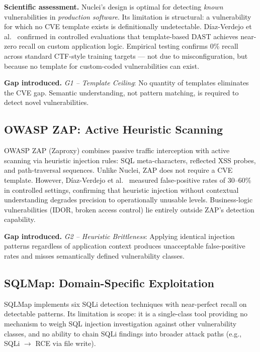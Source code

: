 \documentclass[12pt,a4paper,oneside,openany]{book}
\begin{document}
\textbf{Scientific assessment.} Nuclei's design is optimal for detecting \textit{known} vulnerabilities in \textit{production software}. Its limitation is structural: a vulnerability for which no CVE template exists is definitionally undetectable. D\'iaz-Verdejo et al.\ \cite{diaz2022evaluation} confirmed in controlled evaluations that template-based DAST achieves near-zero recall on custom application logic. Empirical testing confirms 0\% recall across standard CTF-style training targets --- not due to misconfiguration, but because no template for custom-coded vulnerabilities can exist.

\textbf{Gap introduced.} \textit{G1 -- Template Ceiling}: No quantity of templates eliminates the CVE gap. Semantic understanding, not pattern matching, is required to detect novel vulnerabilities.

\subsection{OWASP ZAP: Active Heuristic Scanning}

OWASP ZAP (Zaproxy) combines passive traffic interception with active scanning via heuristic injection rules: SQL meta-characters, reflected XSS probes, and path-traversal sequences. Unlike Nuclei, ZAP does not require a CVE template. However, D\'iaz-Verdejo et al.\ \cite{diaz2022evaluation} measured false-positive rates of 30--60\% in controlled settings, confirming that heuristic injection without contextual understanding degrades precision to operationally unusable levels. Business-logic vulnerabilities (IDOR, broken access control) lie entirely outside ZAP's detection capability.

\textbf{Gap introduced.} \textit{G2 -- Heuristic Brittleness}: Applying identical injection patterns regardless of application context produces unacceptable false-positive rates and misses semantically defined vulnerability classes.

\subsection{SQLMap: Domain-Specific Exploitation}

SQLMap implements six SQLi detection techniques with near-perfect recall on detectable patterns. Its limitation is scope: it is a single-class tool providing no mechanism to weigh SQL injection investigation against other vulnerability classes, and no ability to chain SQLi findings into broader attack paths (e.g., SQLi $\rightarrow$ RCE via file write).
\end{document}
